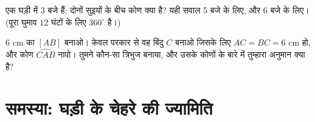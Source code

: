 \begin{exercise}[$\star\star$]\label{exo:g6:lines:11}
एक घड़ी में 3 बजे हैं: दोनों सुइयों के बीच कोण क्या है? यही सवाल
5 बजे के लिए, और 6 बजे के लिए। (पूरा घुमाव $12$ घंटों के लिए
$360^\circ$ है।)
\end{exercise}

\begin{exercise}[$\star\star\star$]\label{exo:g6:lines:12}
$6$ cm का  $[AB]$ बनाओ। केवल परकार से वह बिंदु $C$ बनाओ
जिसके लिए $AC = BC = 6$ cm हो, और कोण $\widehat{CAB}$ नापो।
तुमने कौन-सा त्रिभुज बनाया, और उसके कोणों के बारे में तुम्हारा
अनुमान क्या है?
\end{exercise}

\section{समस्या: घड़ी के चेहरे की ज्यामिति}

